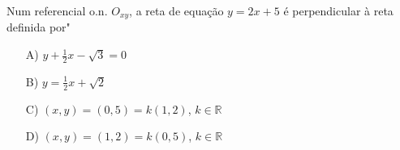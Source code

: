 Num referencial o.n. $O_{xy}$, a reta de equação $y = 2x+5$ é perpendicular à reta definida por"
\begin{enumerate}
\item [A)] $y + \frac 1 2 x -\sqrt 3 = 0$
\item [B)] $y = \frac 1 2 x + \sqrt 2$
\item [C)] $(x,y) = (0,5) = k(1,2)$, $k\in \mathbb{R}$
\item [D)] $(x,y) = (1,2) = k(0,5)$, $k\in \mathbb{R}$
\end{enumerate}